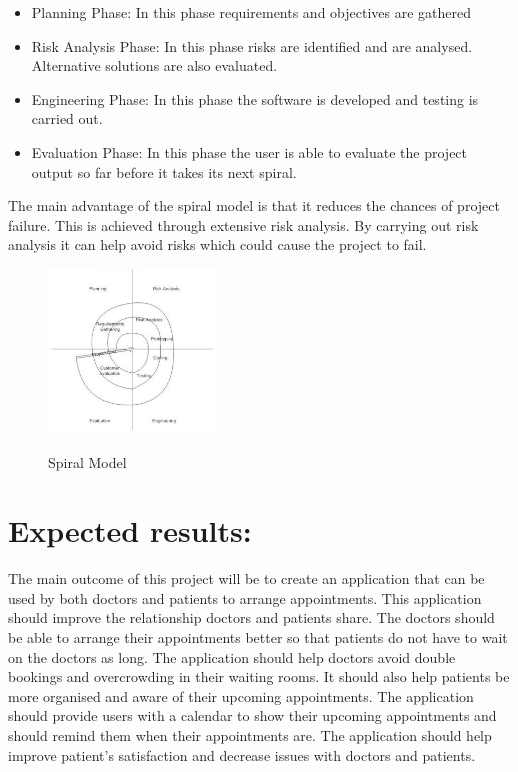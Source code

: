 \documentclass[12pt,ITBthesis]{report}
\begin{document}
	\begin{itemize}
		\item Planning Phase: In this phase requirements and objectives are gathered 
		\item Risk Analysis Phase: In this phase risks are identified and are analysed. Alternative solutions are also evaluated.
		\item Engineering Phase: In this phase the software is developed and testing is carried out. 
		\item Evaluation Phase: In this phase the user is able to evaluate the project output so far before it takes its next spiral. 
	\end{itemize}
	
	The main advantage of the spiral model is that it reduces the chances of project failure. This is achieved through extensive risk analysis. By carrying out risk analysis it can help avoid risks which could cause the project to fail.
	
	\begin{figure}[!h]
		\centering
		\includegraphics[width=0.4\textwidth]{spiralModel}
		\label{ft_fig_firstfig}
		\caption{Spiral Model \cite{4}}
	\end{figure}
	
	\section{Expected results:}
	The main outcome of this project will be to create an application that can be used by both doctors and patients to arrange appointments. This application should improve the relationship doctors and patients share. The doctors should be able to arrange their appointments better so that patients do not have to wait on the doctors as long. The application should help doctors avoid double bookings and overcrowding in their waiting rooms. It should also help patients be more organised and aware of their upcoming appointments. The application should provide users with a calendar to show their upcoming appointments and should remind them when their appointments are. The application should help improve patient’s satisfaction and decrease issues with doctors and patients.
	
\end{document}
